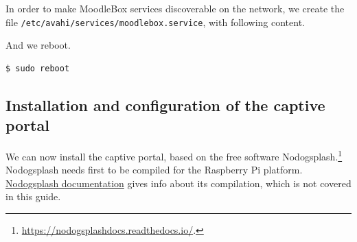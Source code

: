 \documentclass[12pt]{article}
\begin{document}
In order to make MoodleBox services discoverable on the network, we create the file \lstinline{/etc/avahi/services/moodlebox.service}, with following content.

And we reboot.
\begin{lstlisting}[language=bash]
$ sudo reboot
\end{lstlisting}

\subsection{Installation and configuration of the captive portal}

We can now install the captive portal, based on the free software Nodogsplash.\footnote{\url{https://nodogsplashdocs.readthedocs.io/}.}
Nodogsplash needs first to be compiled for the Raspberry Pi platform.
\href{https://nodogsplashdocs.readthedocs.io/en/stable/compile.html}{Nodogsplash documentation} gives info about its compilation, which is not covered in this guide.
\end{document}
